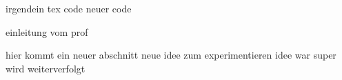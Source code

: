 irgendein tex code
neuer code

einleitung vom prof

hier kommt ein neuer abschnitt
neue idee zum experimentieren
idee war super wird weiterverfolgt
